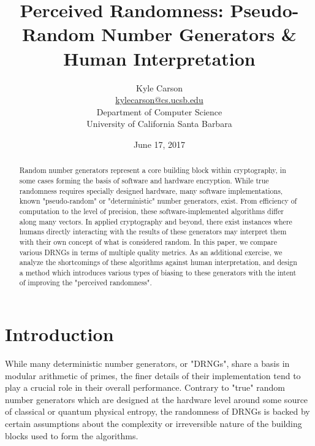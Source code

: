 \documentclass[12pt,letter,notitlepage]{article}
\begin{document}
\title{Perceived Randomness: Pseudo-Random Number Generators \& Human Interpretation}

\author{Kyle Carson \\
\url{kylecarson@cs.ucsb.edu} \\
Department of Computer Science \\
University of California Santa Barbara
}

\date{June 17, 2017}

\maketitle %

\begin{abstract}
Random number generators represent a core building block within cryptography, in some cases forming the basis of software and hardware encryption. While true randomness requires specially designed hardware, many software implementations, known "pseudo-random" or "deterministic" number generators, exist. From efficiency of computation to the level of precision, these software-implemented algorithms differ along many vectors. In applied cryptography and beyond, there exist instances where humans directly interacting with the results of these generators may interpret them with their own concept of what is considered random. In this paper, we compare various DRNGs in terms of multiple quality metrics. As an additional exercise, we analyze the shortcomings of these algorithms against human interpretation, and design a method which introduces various types of biasing to these generators with the intent of improving the "perceived randomness".
\end{abstract}

\section{Introduction}

While many deterministic number generators, or "DRNGs", share a basis in modular arithmetic of primes, the finer details of their implementation tend to play a crucial role in their overall performance. Contrary to "true" random number generators which are designed at the hardware level around some source of classical or quantum physical entropy, the randomness of DRNGs is backed by certain assumptions about the complexity or irreversible nature of the building blocks used to form the algorithms.
\end{document}
